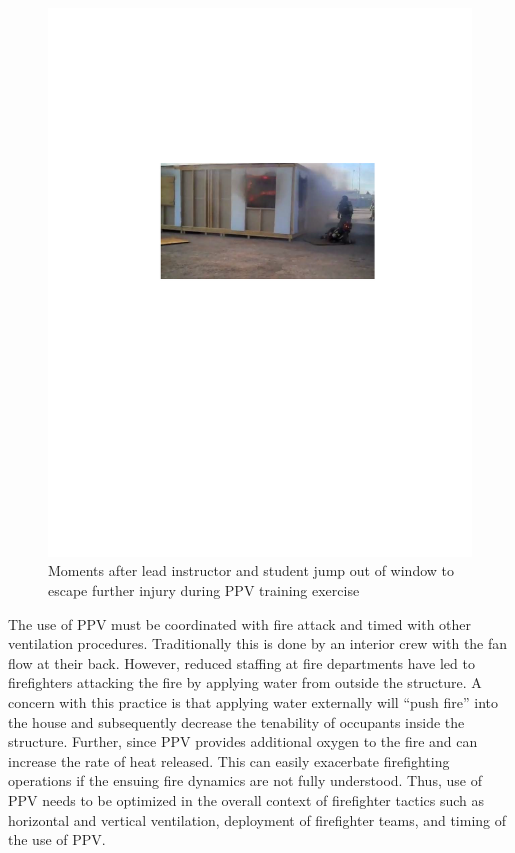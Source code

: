 \documentclass{article}
\begin{document}
\begin{figure}[H]
	\centering
	\includegraphics[width = 5in]{0_Images/Background/PPVTrainingInjury.pdf}
	\caption{Moments after lead instructor and student jump out of window to escape further injury during PPV training exercise}
	\label{fig:PPVTrainingInj}
\end{figure}

The use of PPV must be coordinated with fire attack and timed with other ventilation procedures. Traditionally this is done by an interior crew with the fan flow at their back. However, reduced staffing at fire departments have led to firefighters attacking the fire by applying water from outside the structure. A concern with this practice is that applying water externally will “push fire” into the house and subsequently decrease the tenability of occupants inside the structure. Further, since PPV provides additional oxygen to the fire and can increase the rate of heat released. This can easily exacerbate firefighting operations if the ensuing fire dynamics are not fully understood. Thus, use of PPV needs to be optimized in the overall context of firefighter tactics such as horizontal and vertical ventilation, deployment of firefighter teams, and timing of the use of PPV.
\end{document}
